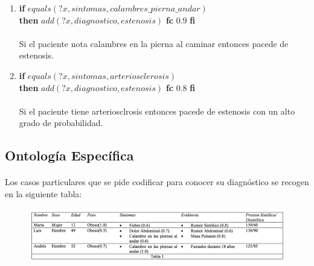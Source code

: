 \documentclass[10pt, a4paper,spanish]{article}
\begin{document}
\begin{enumerate}[label={\textbf{R\theenumi:}}]
				\item
					\textbf{if} $equals(?x, sintomas, calambres\_pierna\_andar)$ \\
					\textbf{then} $add(?x, diagnostico, estenosis)$ \textbf{fc} $0.9$ \textbf{fi}
					\\ \\
					Si el paciente nota calambres en la pierna al caminar entonces pacede de estenosis.

				\item
					\textbf{if} $equals(?x, sintomas, arteriosclerosis)$ \\
					\textbf{then} $add(?x, diagnostico, estenosis)$ \textbf{fc} $0.8$ \textbf{fi}
					\\ \\
					Si el paciente tiene arteriosclrosis entonces pacede de estenosis con un alto grado de probabilidad.
			\end{enumerate}

		\subsection{Ontología Específica}

			\paragraph{}
			Los casos particulares que se pide codificar para conocer su diagnóstico se recogen en la siguiente tabla:

			\begin{figure}[H]
				\begin{center}
					\includegraphics[width=\textwidth]{table-1}
				\end{center}
			\end{figure}
\end{document}
